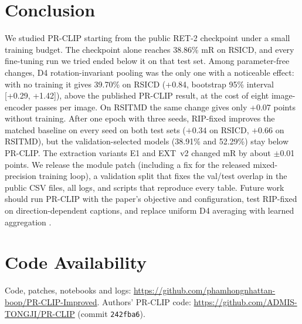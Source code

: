 \documentclass[conference]{IEEEtran}
\begin{document}
\section{Conclusion}
We studied PR-CLIP starting from the public RET-2 checkpoint under a small training budget. The checkpoint alone reaches 38.86\% mR on RSICD, and every fine-tuning run we tried ended below it on that test set. Among parameter-free changes, D4 rotation-invariant pooling was the only one with a noticeable effect: with no training it gives 39.70\% on RSICD (+0.84, bootstrap 95\% interval [+0.29, +1.42]), above the published PR-CLIP result, at the cost of eight image-encoder passes per image. On RSITMD the same change gives only +0.07 points without training. After one epoch with three seeds, RIP-fixed improves the matched baseline on every seed on both test sets ($+0.34$ on RSICD, $+0.66$ on RSITMD), but the validation-selected models (38.91\% and 52.29\%) stay below PR-CLIP. The extraction variants E1 and EXT~v2 changed mR by about $\pm$0.01 points. We release the module patch (including a fix for the released mixed-precision training loop), a validation split that fixes the val/test overlap in the public CSV files, all logs, and scripts that reproduce every table. Future work should run PR-CLIP with the paper's objective and configuration, test RIP-fixed on direction-dependent captions, and replace uniform D4 averaging with learned aggregation \cite{shanmugam2021tta}.

\section*{Code Availability}
Code, patches, notebooks and logs: \url{https://github.com/phamhongnhattan-boop/PR-CLIP-Improved}. Authors' PR-CLIP code: \url{https://github.com/ADMIS-TONGJI/PR-CLIP} (commit \texttt{242fba6}).
\end{document}
